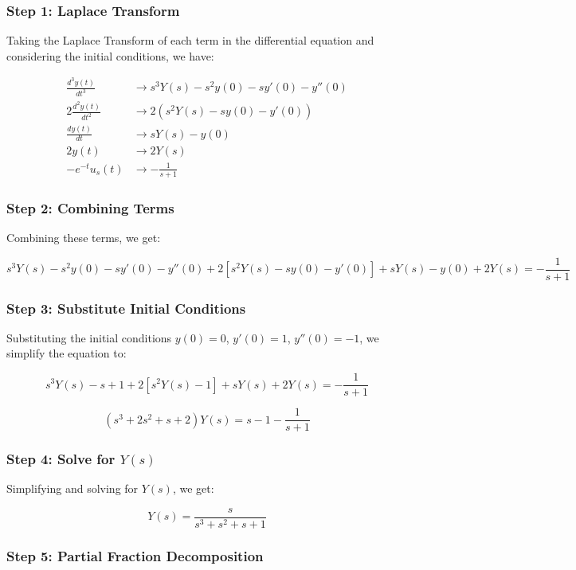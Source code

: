 \documentclass[12pt]{article}
\begin{document}
\subsubsection*{Step 1: Laplace Transform}

Taking the Laplace Transform of each term in the differential equation and considering the initial conditions, we have:

\begin{align*}
\frac{d^3y(t)}{dt^3} &\to s^3 Y(s) - s^2 y(0) - s y'(0) - y''(0) \\
2\frac{d^2y(t)}{dt^2} &\to 2(s^2 Y(s) - s y(0) - y'(0)) \\
\frac{dy(t)}{dt} &\to s Y(s) - y(0) \\
2y(t) &\to 2Y(s) \\
-e^{-t}u_s(t) &\to -\frac{1}{s+1}
\end{align*}

\subsubsection*{Step 2: Combining Terms}

Combining these terms, we get:

\[
s^3 Y(s) - s^2 y(0) - s y'(0) - y''(0) + 2[s^2 Y(s) - s y(0) - y'(0)] + s Y(s) - y(0) + 2Y(s) = -\frac{1}{s+1}
\]

\subsubsection*{Step 3: Substitute Initial Conditions}

Substituting the initial conditions \( y(0) = 0 \), \( y'(0) = 1 \), \( y''(0) = -1 \), we simplify the equation to:

\[
s^3 Y(s) - s + 1 + 2[s^2 Y(s) - 1] + s Y(s) + 2Y(s) = -\frac{1}{s+1}
\]

\[
(s^3 + 2s^2 + s + 2)Y(s) = s - 1 -\frac{1}{s+1}
\]

\subsubsection*{Step 4: Solve for \(Y(s)\)}

Simplifying and solving for \( Y(s) \), we get:

\[
Y(s) = \frac{s}{s^3 + s^2 + s + 1}
\]

\subsubsection*{Step 5: Partial Fraction Decomposition}
\end{document}
